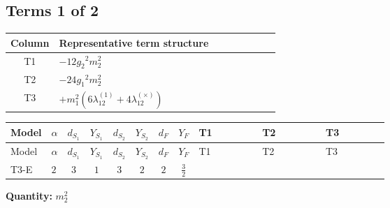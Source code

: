 \documentclass[8pt]{article}
\begin{document}
\begin{landscape}
\subsection*{Terms 1 of 2}
\begin{center}
\begin{tabular}{@{}c >{\raggedright\arraybackslash}p{0.82\linewidth}@{}}
\toprule
Column & Representative term structure \\
\midrule
T1 & \(\displaystyle -12 {g_2}^2 {m_2^2}\) \\
\midrule
T2 & \(\displaystyle -24 {g_1}^2 {m_2^2}\) \\
\midrule
T3 & \(\displaystyle +{m_1^2} (6 {\lambda_{12}^{(1)}}+4 {\lambda_{12}^{(\times)}})\) \\
\midrule
\bottomrule
\end{tabular}
\end{center}
\smallskip
\tiny
\begin{longtable}{@{}llcccccc >{\raggedright\arraybackslash}p{0.21\linewidth} >{\raggedright\arraybackslash}p{0.21\linewidth} >{\raggedright\arraybackslash}p{0.21\linewidth}@{}}
\toprule
Model & $\alpha$ & $d_{S_1}$ & $Y_{S_1}$ & $d_{S_2}$ & $Y_{S_2}$ & $d_F$ & $Y_F$ & T1 & T2 & T3 \\
\midrule
\endfirsthead
\toprule
Model & $\alpha$ & $d_{S_1}$ & $Y_{S_1}$ & $d_{S_2}$ & $Y_{S_2}$ & $d_F$ & $Y_F$ & T1 & T2 & T3 \\
\midrule
\endhead
T3-E & $2$ & $3$ & $1$ & $3$ & $2$ & $2$ & $\frac{3}{2}$ & \scriptsize\adjustbox{max width=\linewidth}{$\begin{gathered} -12 {g_2}^2 {m_2^2}\end{gathered}$} & \scriptsize\adjustbox{max width=\linewidth}{$\begin{gathered} -24 {g_1}^2 {m_2^2}\end{gathered}$} & \scriptsize\adjustbox{max width=\linewidth}{$\begin{gathered} +{m_1^2} (6 {\lambda_{12}^{(1)}}+4 {\lambda_{12}^{(\times)}})\end{gathered}$} \\
\midrule
\bottomrule
\end{longtable}
\clearpage
\noindent\textbf{Quantity: }$m_2^2$\par\smallskip

\end{landscape}
\end{document}
